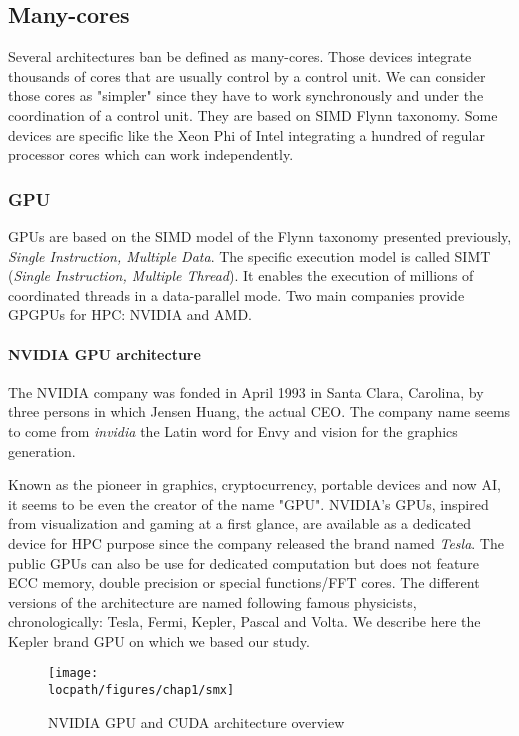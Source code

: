 \subsection{Many-cores}
Several architectures ban be defined as many-cores. 
Those devices integrate thousands of cores that are usually control by a control unit. 
We can consider those cores as "simpler" since they have to work synchronously and under the coordination of a control unit.
They are based on SIMD Flynn taxonomy. 
Some devices are specific like the Xeon Phi of Intel integrating a hundred of regular processor cores which can work independently. 

\subsubsection{GPU}

GPUs are based on the SIMD model of the Flynn taxonomy presented previously, \emph{Single Instruction, Multiple Data}.
The specific execution model is called SIMT (\emph{Single Instruction, Multiple Thread}). It enables the execution of millions of coordinated threads in a data-parallel mode. 
Two main companies provide GPGPUs for  HPC: NVIDIA and AMD.

\paragraph{NVIDIA GPU architecture}

The NVIDIA company was fonded in April 1993 in Santa Clara, Carolina, by three persons in which Jensen Huang, the actual CEO.
The company name seems to come from \textit{invidia} the Latin word for Envy and vision for the graphics generation. 

Known as the pioneer in graphics, cryptocurrency, portable devices and now AI, it seems to be even the creator of the name "GPU".
NVIDIA's GPUs, inspired from visualization and gaming at a first glance, are available as a dedicated device for HPC purpose since the company released the brand named \textit{Tesla}. 
The public GPUs can also be use for dedicated computation but does not feature ECC memory, double precision or special functions/FFT cores. 
The different versions of the architecture are named following famous physicists, chronologically: Tesla, Fermi, Kepler, Pascal and Volta. 
We describe here the Kepler brand GPU on which we based our study. 

\begin{figure*}[t!]
\centering
\setlength\fboxsep{0pt}
\setlength\fboxrule{0.25pt}
\texttt{[image: \\locpath/figures/chap1/smx]}
\caption{NVIDIA GPU and CUDA architecture overview}
 \label{fig:chap1_gpu}
\end{figure*}

